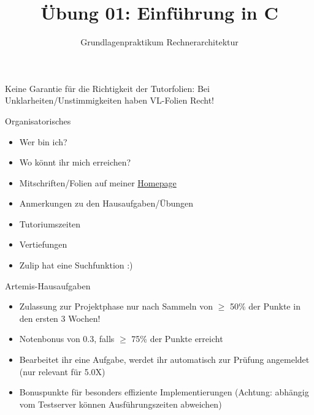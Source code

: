 

\title{Übung 01: Einführung in C}
\subtitle{Grundlagenpraktikum Rechnerarchitektur}
\date{}



\maketitle

\begin{frame}[c]{}{}
	\begin{center}
		\LARGE  Keine Garantie für die Richtigkeit der Tutorfolien: Bei Unklarheiten/Unstimmigkeiten
		haben VL-Folien Recht!
	\end{center}
\end{frame}

\begin{frame}[c]{Organisatorisches}{}
	\begin{itemize}
		\item Wer bin ich?
		\item Wo könnt ihr mich erreichen?
		\item Mitschriften/Folien auf meiner \href{https://home.in.tum.de/~ladu/}{Homepage}
		\item Anmerkungen zu den Hausaufgaben/Übungen
		\item Tutoriumszeiten
		\item Vertiefungen
		\item Zulip hat eine Suchfunktion :)
	\end{itemize}
\end{frame}

\begin{frame}[c]{Artemis-Hausaufgaben}{}
	\begin{itemize}
		\item Zulassung zur Projektphase nur nach Sammeln von $\ge$ 50\%
		      der Punkte in den ersten 3 Wochen!
		\item Notenbonus von 0.3, falls $\ge$ 75\% der Punkte erreicht
		\item Bearbeitet ihr eine Aufgabe, werdet ihr automatisch zur Prüfung
		      angemeldet (nur relevant für 5.0X)
		\item Bonuspunkte für besonders effiziente Implementierungen (Achtung: abhängig
		      vom Testserver können Ausführungszeiten abweichen)
	\end{itemize}
\end{frame}

